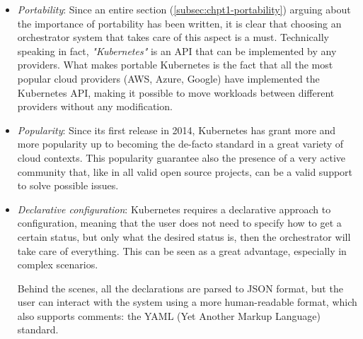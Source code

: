 \begin{itemize}
  \itemsep0em
  \item \textit{Portability}: Since an entire section
    (\ref{subsec:chpt1-portability}) arguing about the importance of
    portability has been written, it is clear that choosing an orchestrator
    system that takes care of this aspect is a must.
    Technically speaking in fact, \textit{"Kubernetes"} is an API that can be
    implemented by any providers. What makes portable Kubernetes is the fact
    that all the most popular cloud providers (AWS, Azure, Google) have
    implemented the Kubernetes API, making it possible to move workloads between
    different providers without any modification.
  \item \textit{Popularity}: Since its first release in 2014, Kubernetes has
     grant more and more popularity up to becoming the de-facto standard in a great
     variety of cloud contexts.
     This popularity guarantee also the presence of a very active community that,
     like in all valid open source projects, can be a valid support to solve
     possible issues.

   \item \textit{Declarative configuration}: Kubernetes requires a declarative
     approach to configuration, meaning that the user does not need to specify
     how to get a certain status, but only what the desired status is, then the
     orchestrator will take care of everything. This can be seen as a great
     advantage, especially in complex scenarios.

     Behind the scenes, all the declarations are parsed to JSON format, but the
     user can interact with the system using a more human-readable format, which
     also supports comments: the YAML (Yet Another Markup Language) standard.


\end{itemize}
